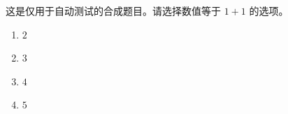 \documentclass[UTF8]{ctexart}
\begin{document}
这是仅用于自动测试的合成题目。请选择数值等于 $1+1$ 的选项。

\begin{enumerate}
  \item[A.] $2$
  \item[B.] $3$
  \item[C.] $4$
  \item[D.] $5$
\end{enumerate}
\end{document}
